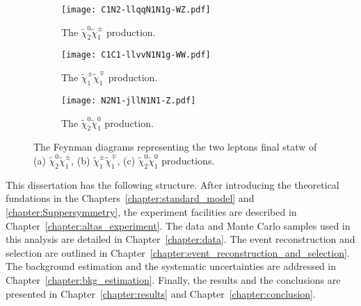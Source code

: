 \begin{figure}[htbp]
    \begin{center}
        \begin{subfigure}[b]{0.32\textwidth}
            \begin{center}
                \texttt{[image: C1N2-llqqN1N1g-WZ.pdf]}
                \caption{The $\widetilde{\chi}^{0}_{2} \widetilde{\chi}^{\pm}_{1}$ production.}
            \end{center}
        \end{subfigure}%
        \begin{subfigure}[b]{0.32\textwidth}
            \begin{center}
                \texttt{[image: C1C1-llvvN1N1g-WW.pdf]}
                \caption{The $\widetilde{\chi}^{\pm}_{1} \widetilde{\chi}^{\mp}_{1}$ production.}
            \end{center}
        \end{subfigure}
        \begin{subfigure}[b]{0.32\textwidth}
            \begin{center}
                \texttt{[image: N2N1-jllN1N1-Z.pdf]}
                \caption{The $\widetilde{\chi}^{0}_{2} \widetilde{\chi}^{0}_{1}$ production.}
            \end{center}
        \end{subfigure}
    \end{center}
    \caption{The Feynman diagrams representing the two leptons final statw of (a) $\widetilde{\chi}^{0}_{2} \widetilde{\chi}^{\pm}_{1}$, (b) $\widetilde{\chi}^{\pm}_{1} \widetilde{\chi}^{\mp}_{1}$, (c) $\widetilde{\chi}^{0}_{2} \widetilde{\chi}^{0}_{1}$ productions.}
    \label{fig:intro_feynman_diagrams}
\end{figure}

This dissertation has the following structure.
After introducing the theoretical fundations in the Chapters~\ref{chapter:standard_model} and \ref{chapter:Suppersymmetry}, the experiment facilities are described in Chapter~\ref{chapter:altas_experiment}.
The data and Mante Carlo samples used in this analysis are detailed in Chapter~\ref{chapter:data}.
The event reconstruction and selection are outlined in Chapter~\ref{chapter:event_reconstruction_and_selection}.
The background estimation and the systematic uncertainties are addressed in Chapter~\ref{chapter:bkg_estimation}.
Finally, the results and the conclusions are presented in Chapter~\ref{chapter:results} and Chapter~\ref{chapter:conclusion}.
